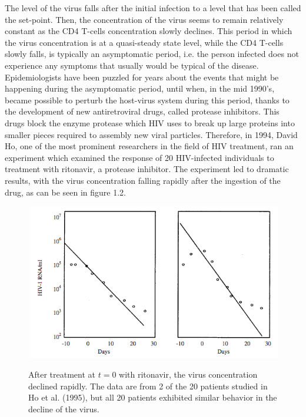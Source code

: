 The level of the virus falls after the initial infection to a level that has been called the set-point. Then, the concentration of the virus seems to remain relatively constant as the CD4 T-cells concentration slowly declines. This period in which the virus concentration is at a quasi-steady state level, while the CD4 T-cells slowly falls, is typically an asymptomatic period, i.e. the person infected does not experience any symptoms that usually would be typical of the disease.\\
Epidemiologists have been puzzled for years about the events that might be happening during the asymptomatic period, until when, in the mid 1990's, became possible to perturb the host-virus system during this period, thanks to the development of new antiretroviral drugs, called protease inhibitors. This drugs block the enzyme protease which HIV uses to  break up large proteins into smaller pieces required to assembly new viral particles. Therefore, in 1994, David Ho, one of the most prominent researchers in the field of HIV treatment, ran an experiment which examined the response of 20 HIV-infected individuals to treatment with ritonavir, a protease inhibitor. The experiment led to dramatic results, with the virus concentration falling rapidly after the ingestion of the drug, as can be seen in figure 1.2.

\begin{figure}[H]
	{\includegraphics[scale=0.7]{HIV-Protease.png}}
	\caption{After treatment at $t=0$ with ritonavir, the virus concentration declined rapidly. The data are from 2 of the 20 patients studied in Ho et al. (1995), but all 20 patients exhibited similar behavior in the decline of the virus.}
\end{figure}


